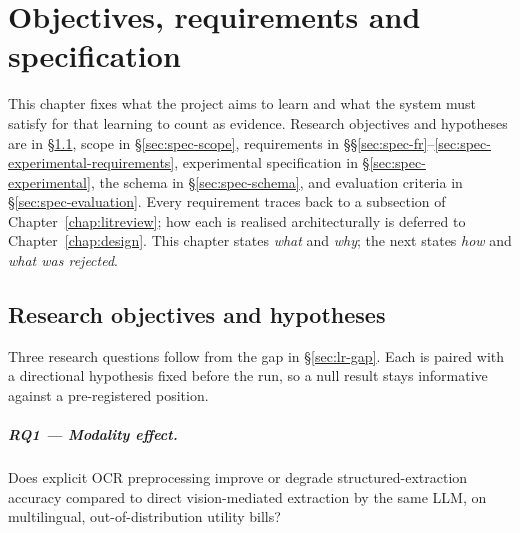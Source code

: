 
\chapter{Objectives, requirements and specification}
\label{chap:spec}

This chapter fixes what the project aims to learn and what the
system must satisfy for that learning to count as evidence. Research
objectives and hypotheses are in \S\ref{sec:spec-objectives}, scope
in \S\ref{sec:spec-scope}, requirements in
\S\S\ref{sec:spec-fr}--\ref{sec:spec-experimental-requirements},
experimental specification in \S\ref{sec:spec-experimental}, the
schema in \S\ref{sec:spec-schema}, and evaluation criteria in
\S\ref{sec:spec-evaluation}. Every requirement traces back to a
subsection of Chapter~\ref{chap:litreview}; how each is realised
architecturally is deferred to Chapter~\ref{chap:design}. This
chapter states \textit{what} and \textit{why}; the next states
\textit{how} and \textit{what was rejected}.

\section{Research objectives and hypotheses}
\label{sec:spec-objectives}

Three research questions follow from the gap in
\S\ref{sec:lr-gap}. Each is paired with a directional hypothesis
fixed before the run, so a null result stays informative against a
pre-registered position.

\paragraph{RQ1 --- Modality effect.} Does explicit OCR preprocessing
improve or degrade structured-extraction accuracy compared to
direct vision-mediated extraction by the same LLM, on multilingual,
out-of-distribution utility bills?

